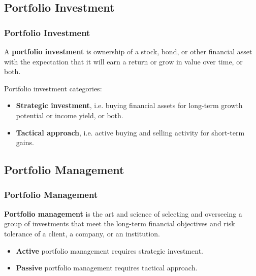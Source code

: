 \documentclass{beamer}
\begin{document}
\subsection{Portfolio Investment}

\begin{frame}
\frametitle{\textbf{Portfolio Investment}}

\begin{definition}
\justifying
A \textbf{portfolio investment} is ownership of a stock, bond, or other financial asset with the expectation that it will earn a return or grow in value over time, or both.
\end{definition}

\vspace{0.6cm}
\justifying
Portfolio investment categories:
\vspace{0.2cm}
\justifying
\begin{itemize}
	\justifying
	\item \textbf{Strategic investment}, i.e. buying financial assets for long-term growth potential or income yield, or both.
	\item \textbf{Tactical approach}, i.e. active buying and selling activity for short-term gains.
\end{itemize}


\end{frame}





\subsection{Portfolio Management}

\begin{frame}
\frametitle{\textbf{Portfolio Management}}

\begin{definition}
\justifying
\textbf{Portfolio management} is the art and science of selecting and overseeing a group of investments that meet the long-term financial objectives and risk tolerance of a client, a company, or an institution.
\end{definition}

\vspace{0.8cm}
\begin{itemize}
	\justifying
	\item \textbf{Active} portfolio management requires strategic investment.
	\item \textbf{Passive} portfolio management requires tactical approach.
\end{itemize}


\end{frame}
\end{document}
